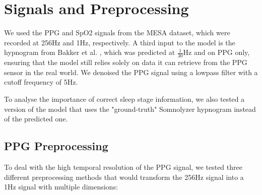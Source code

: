 \section{Signals and Preprocessing}

We used the PPG and SpO2 signals from the MESA dataset, which were recorded at 256Hz and 1Hz, respectively. A third input to the model is the hypnogram from Bakker et al. \cite{bakker2021estimating}, which was predicted at $\frac{1}{30}$Hz and on PPG only, ensuring that the model still relies solely on data it can retrieve from the PPG sensor in the real world.
We denoised the PPG signal using a lowpass filter with a cutoff frequency of 5Hz.

To analyse the importance of correct sleep stage information, we also tested a version of the model that uses the "ground-truth" Somnolyzer hypnogram instead of the predicted one.

\subsection*{PPG Preprocessing}

To deal with the high temporal resolution of the PPG signal, we tested three different preprocessing methods that would transform the 256Hz signal into a 1Hz signal with multiple dimensions:

